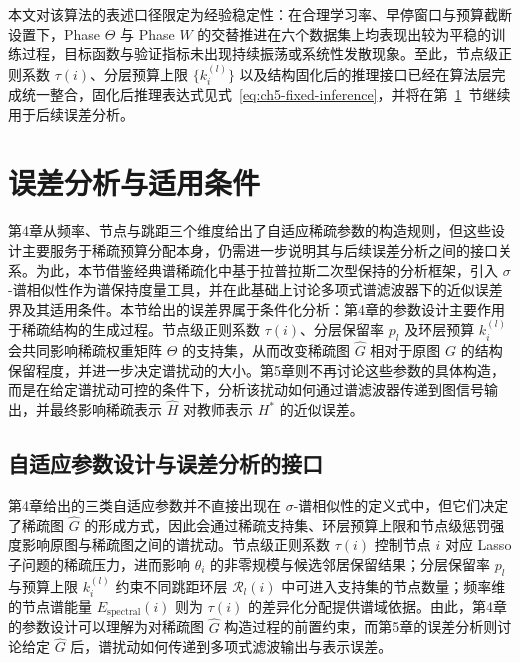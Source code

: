本文对该算法的表述口径限定为经验稳定性：在合理学习率、早停窗口与预算截断设置下，Phase $\Theta$ 与 Phase $W$ 的交替推进在六个数据集上均表现出较为平稳的训练过程，目标函数与验证指标未出现持续振荡或系统性发散现象。至此，节点级正则系数 $\tau(i)$、分层预算上限 $\{k_i^{(l)}\}$ 以及结构固化后的推理接口已经在算法层完成统一整合，固化后推理表达式见式~\eqref{eq:ch5-fixed-inference}，并将在第~\ref{sec:ch5-spectral}~节继续用于后续误差分析。


\section{误差分析与适用条件}
\label{sec:ch5-spectral}
\label{idx:innov:sigma}

第4章从频率、节点与跳距三个维度给出了自适应稀疏参数的构造规则，但这些设计主要服务于稀疏预算分配本身，仍需进一步说明其与后续误差分析之间的接口关系。为此，本节借鉴经典谱稀疏化中基于拉普拉斯二次型保持的分析框架\cite{Spielman2011EffectiveResistances,Spielman2011SpectralSparsification,Batson2013SpectralSparsificationSurvey}，引入 $\sigma$-谱相似性作为谱保持度量工具，并在此基础上讨论多项式谱滤波器下的近似误差界及其适用条件。本节给出的误差界属于条件化分析：第4章的参数设计主要作用于稀疏结构的生成过程。节点级正则系数 $\tau(i)$、分层保留率 $p_l$ 及环层预算 $k_i^{(l)}$ 会共同影响稀疏权重矩阵 $\Theta$ 的支持集，从而改变稀疏图 $\hat{G}$ 相对于原图 $G$ 的结构保留程度，并进一步决定谱扰动的大小。第5章则不再讨论这些参数的具体构造，而是在给定谱扰动可控的条件下，分析该扰动如何通过谱滤波器传递到图信号输出，并最终影响稀疏表示 $\hat{H}$ 对教师表示 $H^*$ 的近似误差。

\subsection{自适应参数设计与误差分析的接口}
\label{subsec:ch5-param-error-interface}

第4章给出的三类自适应参数并不直接出现在 $\sigma$-谱相似性的定义式中，但它们决定了稀疏图 $\hat{G}$ 的形成方式，因此会通过稀疏支持集、环层预算上限和节点级惩罚强度影响原图与稀疏图之间的谱扰动。节点级正则系数 $\tau(i)$ 控制节点 $i$ 对应 Lasso 子问题的稀疏压力，进而影响 $\theta_i$ 的非零规模与候选邻居保留结果；分层保留率 $p_l$ 与预算上限 $k_i^{(l)}$ 约束不同跳距环层 $\mathcal{R}_l(i)$ 中可进入支持集的节点数量；频率维的节点谱能量 $E_{\mathrm{spectral}}(i)$ 则为 $\tau(i)$ 的差异化分配提供谱域依据。由此，第4章的参数设计可以理解为对稀疏图 $\hat{G}$ 构造过程的前置约束，而第5章的误差分析则讨论给定 $\hat{G}$ 后，谱扰动如何传递到多项式滤波输出与表示误差。

